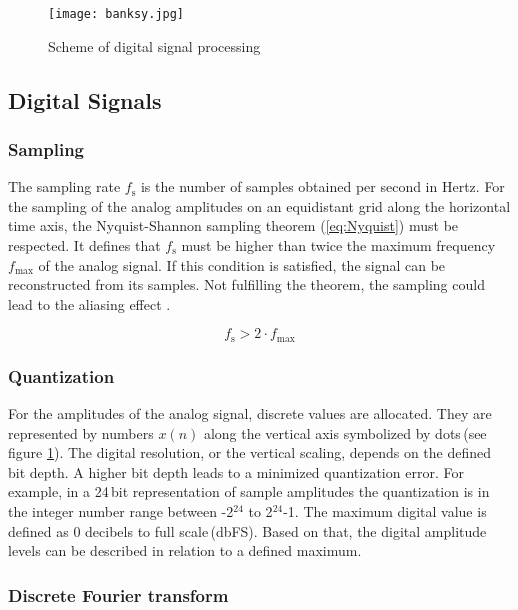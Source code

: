 \begin{figure}[H]
	\centering \texttt{[image: banksy.jpg]}
	\caption[DSPScheme]{Scheme of digital signal processing \cite[p.\,3]{Zolzer:2002}}
	\label{fig:DSPScheme}
\end{figure}


\subsection{Digital Signals}
\subsubsection{Sampling}
The sampling rate $f_\mathrm{s}$ is the number of samples obtained per second in Hertz.
For the sampling of the analog amplitudes on an equidistant grid along the horizontal time axis, the Nyquist-Shannon sampling theorem (\ref{eq:Nyquist}) must be respected.
It defines that $f_\mathrm{s}$ must be higher than twice the maximum frequency $f_{\mathrm{max}}$ of the analog signal.
If this condition is satisfied, the signal can be reconstructed from its samples.
Not fulfilling the theorem, the sampling could lead to the aliasing effect \cite[p.\,103]{Werner:2010}.

\begin{equation}
f_\mathrm{s} > 2\cdot f_{\mathrm{max}} 
\label{eq:Nyquist}
\end{equation}


\subsubsection{Quantization}

For the amplitudes of the analog signal, discrete values are allocated.
They are represented by numbers $x(n)$ along the vertical axis symbolized by dots\,(see figure \ref{fig:DSPScheme}).
The digital resolution, or the vertical scaling, depends on the defined bit depth.
A higher bit depth leads to a minimized quantization error.
For example, in a 24\,bit representation of sample amplitudes the quantization is in the integer number range between -2$^{24}$ to 2$^{24}$-1.
The maximum digital value is defined as 0 decibels to full scale\,(dbFS). Based on that, the digital amplitude levels can be described in relation to a defined maximum.


\subsubsection{Discrete Fourier transform}

